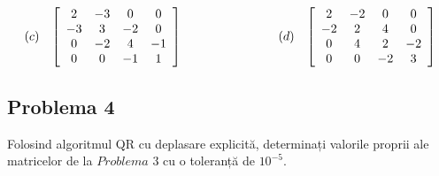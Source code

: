 \documentclass{exam}
\begin{document}
\begin{equation*}
	\begin{array}{cccc}
		(c)                                        &
		\left [\begin{array}{cccc}
				       2  & -3 & 0  & 0  \\
				       -3 & 3  & -2 & 0  \\
				       0  & -2 & 4  & -1 \\
				       0  & 0  & -1 & 1  \\
			       \end{array} \right] \hspace{0.2\textwidth} &

		(d)                                        &
		\left [\begin{array}{cccc}
				       2  & -2 & 0  & 0  \\
				       -2 & 2  & 4  & 0  \\
				       0  & 4  & 2  & -2 \\
				       0  & 0  & -2 & 3  \\
			       \end{array} \right]
	\end{array}
\end{equation*}



\subsection{Problema 4}
Folosind algoritmul QR cu deplasare explicită, determinați valorile proprii ale matricelor de la $Problema$ $3$ cu o toleranță de $10^{-5}$.
\end{document}
